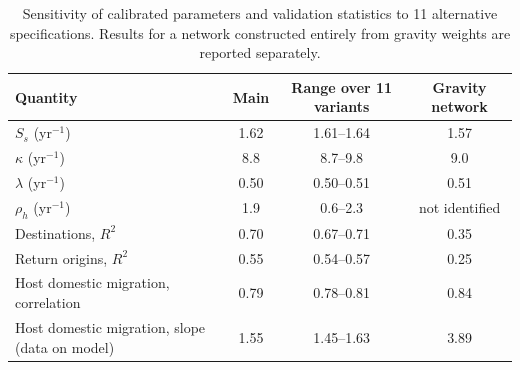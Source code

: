 \documentclass[11pt]{article}
\begin{document}
\begin{table}[h]
\centering\small
\caption{Sensitivity of calibrated parameters and validation statistics to 11 alternative specifications. Results for a network constructed entirely from gravity weights are reported separately.}
\label{tab:sens}
\begin{tabular}{lccc}
\toprule
Quantity & Main & Range over 11 variants & Gravity network\\
\midrule
$S_s$ (yr$^{-1}$) & 1.62 & 1.61--1.64 & 1.57\\
$\kappa$ (yr$^{-1}$) & 8.8 & 8.7--9.8 & 9.0\\
$\lambda$ (yr$^{-1}$) & 0.50 & 0.50--0.51 & 0.51\\
$\rho_h$ (yr$^{-1}$) & 1.9 & 0.6--2.3 & not identified\\
Destinations, $R^2$ & 0.70 & 0.67--0.71 & 0.35\\
Return origins, $R^2$ & 0.55 & 0.54--0.57 & 0.25\\
Host domestic migration, correlation & 0.79 & 0.78--0.81 & 0.84\\
Host domestic migration, slope (data on model) & 1.55 & 1.45--1.63 & 3.89\\
\bottomrule
\end{tabular}
\end{table}
\end{document}
